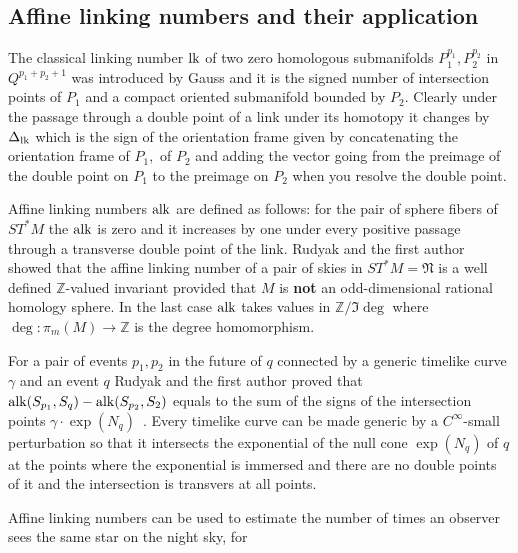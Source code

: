 \documentclass[12pt,reqno,a4paper]{amsart}
\begin{document}
    \subsection{Affine linking numbers and their application }
        The classical linking number $\mathop{\mathrm{lk}}\nolimits$ of two zero homologous submanifolds
        $P_1^{p_1}, P_2^{p_2}$ in $Q^{p_1+p_2+1}$ was introduced by Gauss and
        it is the signed number of intersection points of $P_1$ and a compact
        oriented submanifold bounded by $P_2.$ Clearly under the passage
        through a double point of a link under its homotopy it changes by
        $\Delta_{\mathop{\mathrm{lk}}\nolimits}$ which is the sign of the orientation frame given by
        concatenating the orientation frame of $P_1,$ of $ P_2$ and adding
        the vector going from the preimage of the double point on $P_1$ to
        the preimage on $P_2$ when you resolve the double point.
        \par\hfill\par
        Affine linking numbers $\mathop{\mathrm{alk}}\nolimits$ are defined as follows:
        for the pair of sphere fibers of $ST^*M$ the $\mathop{\mathrm{alk}}\nolimits$ is zero and it
        increases by one under every positive passage through a transverse
        double point of the link. Rudyak and the first
        author~\cite{ChernovRudyak} showed that the affine linking number of
        a pair of skies in $ST^*M=\mathfrak N$ is a well defined $\mathbb{Z}$-valued
        invariant provided that $M$ is {\bf not} an odd-dimensional
        rational homology sphere. In the last case $\mathop{\mathrm{alk}}\nolimits$ takes values in
        $\mathbb{Z}/\Im \deg$ where $\deg:\pi_m(M)\to \mathbb{Z}$ is the degree homomorphism.
        \par\hfill\par
        For a pair of events $p_1, p_2$ in the future of $q$ connected by
        a generic timelike curve $\gamma$ and an event $q$ Rudyak and the
        first author proved that $\mathop{\mathrm{alk}}\nolimits(S_{p_1}, S_q)-\mathop{\mathrm{alk}}\nolimits(S_{p_2}, S_2)$
        equals to the sum of the signs of the intersection points
        $\gamma\cdot\exp(N_q)$~\cite{ChernovRudyak}. Every timelike curve can
        be made generic by a $C^{\infty}$-small perturbation so that it
        intersects the exponential of the null cone $\exp(N_q)$ of $q$ at the
        points where the exponential is immersed and there are no double points
        of it and the intersection is transvers at all points.
        \par\hfill\par
        Affine linking numbers can be used to estimate the number of
        times an observer sees the same star on the night sky, for
\end{document}
